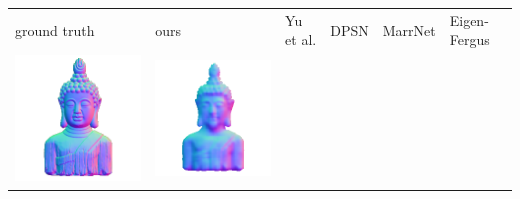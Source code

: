 \begin{center}
\begin{tabularx}{\linewidth}{@{}Y@{}Y@{}Y@{}Y@{}Y@{}Y@{}}
ground truth & ours & Yu et al. & DPSN & MarrNet & Eigen-Fergus \\
\includegraphics[width=\linewidth]{semisynthetic/20160617_16_gt.png} &
\includegraphics[width=\linewidth]{semisynthetic/20160617_16_ours_out.png} &

\end{tabularx}
\end{center}
